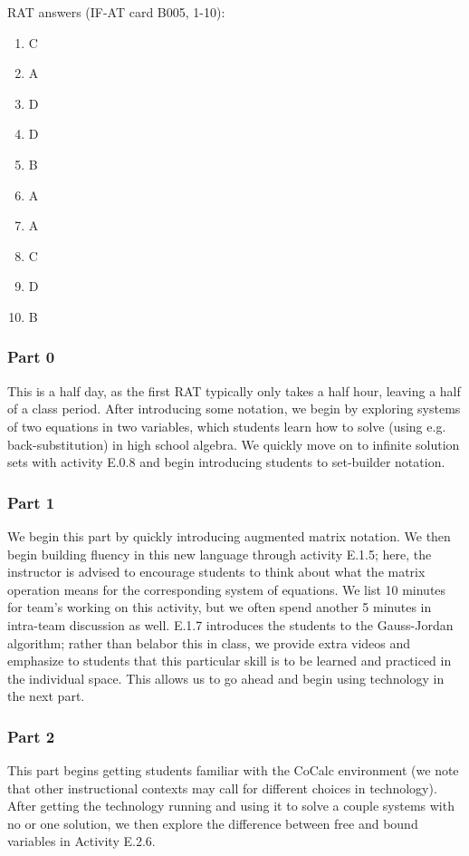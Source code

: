 \documentclass{article}
\begin{document}
RAT answers (IF-AT card B005, 1-10):
\begin{multicols}{10}
\begin{enumerate}[1)]
\item C
\item A
\item D
\item D
\item B
\item A
\item A
\item C
\item D
\item B
\end{enumerate}
\end{multicols}

\subsubsection*{Part 0}
This is a half day, as the first RAT typically only takes a half hour, leaving a half of a class period.  After introducing some notation, we begin by exploring systems of two equations in two variables, which students learn how to solve (using e.g. back-substitution) in high school algebra.  We quickly move on to infinite solution sets with activity E.0.8 and begin introducing students to set-builder notation.


\subsubsection*{Part 1}
We begin this part by quickly introducing augmented matrix notation.  We then begin building fluency in this new language through activity E.1.5; here, the instructor is advised to encourage students to think about what the matrix operation means for the corresponding system of equations.  We list 10 minutes for team's working on this activity, but we often spend another 5 minutes in intra-team discussion as well.  E.1.7 introduces the students to the Gauss-Jordan algorithm; rather than belabor this in class, we provide extra videos and emphasize to students that this particular skill is to be learned and practiced in the individual space.  This allows us to go ahead and begin using technology in the next part.

\subsubsection*{Part 2}
This part begins getting students familiar with the CoCalc environment (we note that other instructional contexts may call for different choices in technology).  After getting the technology running and using it to solve a couple systems with no or one solution, we then explore the difference between free and bound variables in Activity E.2.6.
\end{document}
